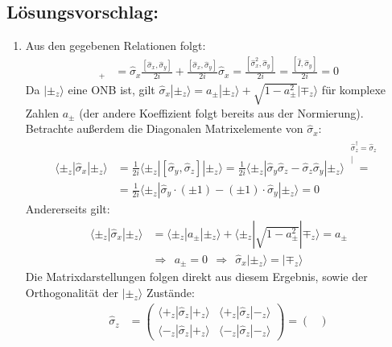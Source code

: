 \documentclass[a4paper,12pt]{article}
\newcommand{\kom}{}
\newcommand{\braket}{}
\newcommand{\Ket}{}
\begin{document}
\subsection*{Lösungsvorschlag:}
\begin{enumerate}
\item[a)] Aus den gegebenen Relationen folgt:
\begin{align*}
[\hat{\sigma}_x,\hat{\sigma}_z]_+&=\hat{\sigma}_x\frac{[\hat{\sigma}_x,\hat{\sigma}_y]}{2i}+\frac{[\hat{\sigma}_x,\hat{\sigma}_y]}{2i}\hat{\sigma}_x=\frac{[\hat{\sigma}_x^2,\hat{\sigma}_y]}{2i}=\frac{[\hat{I},\hat{\sigma}_y]}{2i}=0
\end{align*}
Da $\Ket | {\pm_z} \rangle$ eine ONB ist, gilt $\hat{\sigma}_x\Ket | {\pm_z} \rangle=a_\pm\Ket | {\pm_z} \rangle+\sqrt{1-a_\pm^2}\Ket | {\mp_z} \rangle$ für komplexe Zahlen $a_\pm$ (der andere Koeffizient folgt bereits aus der Normierung). Betrachte außerdem die Diagonalen Matrixelemente von $\hat{\sigma}_x$:
\begin{align*}
\braket\langle {\pm_z} | {\hat{\sigma}_x} | {\pm_z}\rangle&=\frac{1}{2i}\braket\langle {\pm_z} | {[\hat{\sigma}_y,\hat{\sigma}_z]} | {\pm_z}\rangle=\frac{1}{2i}\braket\langle {\pm_z} | {\hat{\sigma}_y\hat{\sigma}_z-\hat{\sigma}_z\hat{\sigma}_y} | {\pm_z}\rangle\kom\overset{\substack{{\hat{\sigma}_z^\dagger = \hat{\sigma}_z} \\ |}}{=}\\
&=\frac{1}{2i}\braket\langle {\pm_z} | {\hat{\sigma}_y\cdot (\pm 1)-(\pm 1)\cdot\hat{\sigma}_y} | {\pm_z}\rangle=0
\end{align*}
Andererseits gilt:
\begin{align*}
\braket\langle {\pm_z} | {\hat{\sigma}_x} | {\pm_z}\rangle&=\braket\langle {\pm_z} | {a_\pm} | {\pm_z}\rangle+\braket\langle {\pm_z} | {\sqrt{1-a_\pm^2}} | {\mp_z}\rangle=a_\pm\\
&\Rightarrow\ \ a_\pm=0\ \ \Rightarrow\ \ \hat{\sigma}_x\Ket | {\pm_z} \rangle=\Ket | {\mp_z} \rangle
\end{align*}
Die Matrixdarstellungen folgen direkt aus diesem Ergebnis, sowie der Orthogonalität der $\Ket | {\pm_z} \rangle$ Zustände:
\begin{align*}
\hat{\sigma}_z&=\begin{pmatrix}
\braket\langle {+_z} | {\hat{\sigma}_z} | {+_z}\rangle & \braket\langle {+_z} | {\hat{\sigma}_z} | {-_z}\rangle \\ \braket\langle {-_z} | {\hat{\sigma}_z} | {+_z}\rangle & \braket\langle {-_z} | {\hat{\sigma}_z} | {-_z}\rangle 
\end{pmatrix}=\begin{pmatrix}

\end{pmatrix}
\end{align*}
\end{enumerate}
\end{document}
